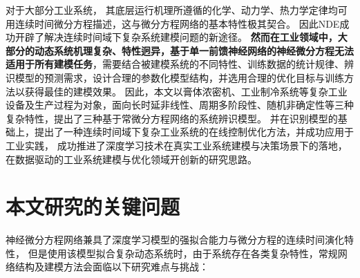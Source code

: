 

对于大部分工业系统，
其底层运行机理所遵循的化学、动力学、热力学定律均可用连续时间微分方程描述，这与微分方程网络的基本特性极其契合。
因此NDE成功开辟了解决连续时间域下复杂系统建模问题的新途径。
\textbf{然而在工业领域中，大部分的动态系统机理复杂、特性迥异，基于单一前馈神经网络的神经微分方程无法适用于所有建模任务}，需要结合被建模系统的不同特性、训练数据的统计规律、辨识模型的预测需求，设计合理的参数化模型结构，并选用合理的优化目标与训练方法以获得最佳的建模效果。
因此，本文以膏体浓密机、工业制冷系统等复杂工业设备及生产过程为对象，面向长时延非线性、周期多阶段性、随机非确定性等三种复杂特性，提出了三种基于常微分方程网络的系统辨识模型。
并在识别模型的基础上，提出了一种连续时间域下复杂工业系统的在线控制优化方法，并成功应用于工业实践，
成功推进了深度学习技术在真实工业系统建模与决策场景下的落地，
在数据驱动的工业系统建模与优化领域开创新的研究思路。
\section{本文研究的关键问题}
\label{sec:challenge}

神经微分方程网络兼具了深度学习模型的强拟合能力与微分方程的连续时间演化特性，
但是使用该模型拟合复杂动态系统时，由于系统存在各类复杂特性，常规网络结构及建模方法会面临以下研究难点与挑战：
